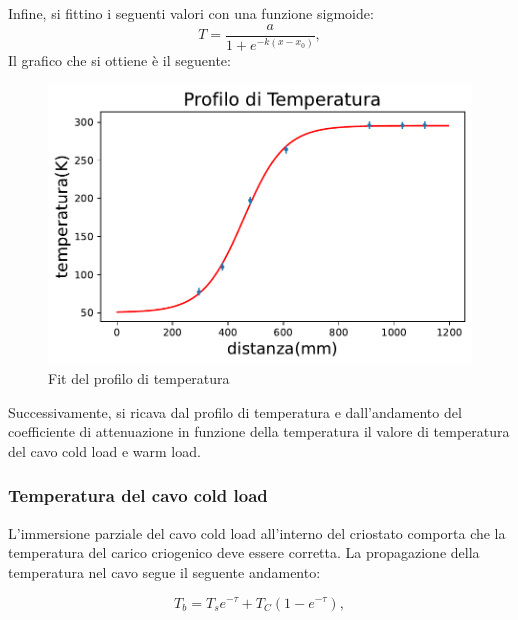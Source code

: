 Infine, si fittino i seguenti valori con una funzione sigmoide:
\begin{equation}
T= \dfrac{a}{1+e^{-k(x-x_{0})}},
\end{equation}
Il grafico che si ottiene è il seguente:
\begin{figure}[h]
	\centering
	\includegraphics[scale=0.8]{Profilo_temperatura.pdf}
	\caption{Fit del profilo di temperatura}
    	\label{fig:Profilo_temperatura}
\end{figure}
Successivamente, si ricava dal profilo di  temperatura e dall'andamento del coefficiente di attenuazione in funzione della temperatura il valore di temperatura del cavo cold load e warm load.


\subsubsection{Temperatura del cavo cold load}
\label{ssec:Temperatura del cavo cold load}

L'immersione parziale del cavo cold load all'interno del criostato comporta che la temperatura del carico criogenico deve essere corretta. La propagazione della temperatura nel cavo segue il seguente andamento:

\begin{equation}
T_{b}= T_{s}e^{-\tau} + T_{C}(1-e^{-\tau}),
\label{Formula ricorsiva}
\end{equation}

